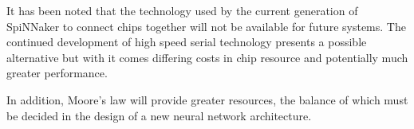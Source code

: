 	It has been noted that the technology used by the current generation of
	SpiNNaker to connect chips together will not be available for future systems.
	The continued development of high speed serial technology presents a possible
	alternative but with it comes differing costs in chip resource and potentially
	much greater performance.
	
	In addition, Moore's law will provide greater resources, the balance of which
	must be decided in the design of a new neural network architecture.
	
